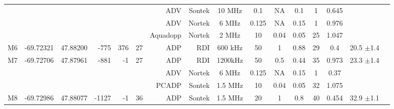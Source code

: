 \documentclass[letterpaper,10pt,landscape]{article}
\begin{document}
\begin{table}
\begin{tabular}{|r|c|c|r|r|r|r|r|c|c|c|c|c|c|c|c|}
    ~                   &                            &                           &                        &                      &                     & ADV          & Sontek     & 10 MHz    & 0.1       & NA       & 0.1        & 1          & 0.645      &                                    \\ 
    ~                   &                            &                           &                        &                      &                     & ADV          & Nortek     & 6 MHz     & 0.125     & NA       & 0.15       & 1          & 0.976      &                                    \\ %
    ~                   &                            &                           &                        &                      &                     & Aquadopp     & Nortek     & 2 MHz     & 10        & 0.04     & 0.05       & 25         & 1.047      &                                    \\\hline
    M6                  & -69.72321                  & 47.88200                  & -775                   & 376                  & 27                  & ADP          & RDI        & 600 kHz   & 50        & 1        & 0.88       & 29         & 0.4        &  20.5 $\pm$1.4                     \\\hline
    \multirow{3}{*}{M7} & \multirow{3}{*}{-69.72706} & \multirow{3}{*}{47.87961} & \multirow{3}{*}{-881}  & \multirow{3}{*}{-1}  & \multirow{3}{*}{27} & ADP          & RDI        & 1200kHz   & 50        & 0.5      & 0.44       & 35         & 0.973      &  \multirow{3}{*}{23.3 $\pm$1.4}    \\ 
    ~                   &                            &                           &                        &                      &                     & ADV          & Nortek     & 6 MHz     & 0.125     & NA       & 0.15       & 1          & 0.37       &                                    \\ %
    ~                   &                            &                           &                        &                      &                     & PCADP        & Sontek     & 1.5 MHz   & 10        & 0.04     & 0.05       & 32         & 1.075      &                                    \\\hline
    \multirow{4}{*}{M8} & \multirow{4}{*}{-69.72986} & \multirow{4}{*}{47.88077} & \multirow{4}{*}{-1127} & \multirow{4}{*}{-1}  & \multirow{4}{*}{36} & ADP          & Sontek     & 1.5 MHz   & 20        & 1        & 0.8        & 40         & 0.454      &  \multirow{4}{*}{32.9 $\pm$1.1}    \\ 

\end{tabular}
\end{table}
\end{document}
